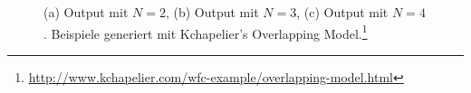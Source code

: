 \documentclass[12pt, a4paper,twoside,openright]{report} %
\begin{document}
\begin{figure}[H]
    \centering
    \qquad
    \qquad
    \caption[]{(a) Output mit $N = 2$, (b) Output mit $N = 3$, (c) Output mit $N = 4$. Beispiele generiert mit Kchapelier's Overlapping Model.\footnote[3]{\url{http://www.kchapelier.com/wfc-example/overlapping-model.html}}}
\end{figure}
\end{document}
